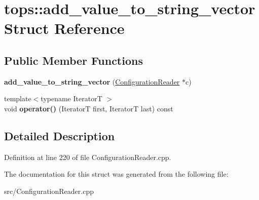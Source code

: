 \hypertarget{structtops_1_1add__value__to__string__vector}{}\section{tops\+:\+:add\+\_\+value\+\_\+to\+\_\+string\+\_\+vector Struct Reference}
\label{structtops_1_1add__value__to__string__vector}
\subsection*{Public Member Functions}
\begin{DoxyCompactItemize}
\item 
\mbox{\label{structtops_1_1add__value__to__string__vector_ae2d1c72b64b8dd7a7edb918a5edc99ba}} 
{\bfseries add\+\_\+value\+\_\+to\+\_\+string\+\_\+vector} (\hyperlink{classtops_1_1ConfigurationReader}{Configuration\+Reader} $\ast$c)
\item 
\mbox{\label{structtops_1_1add__value__to__string__vector_a1f4498803240490b725cbb344cad7e40}} 
{\footnotesize template$<$typename IteratorT $>$ }\\void {\bfseries operator()} (IteratorT first, IteratorT last) const
\end{DoxyCompactItemize}


\subsection{Detailed Description}


Definition at line 220 of file Configuration\+Reader.\+cpp.



The documentation for this struct was generated from the following file\+:\begin{DoxyCompactItemize}
\item 
src/Configuration\+Reader.\+cpp\end{DoxyCompactItemize}
